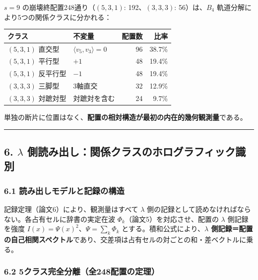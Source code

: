 \documentclass[
]{ltjsarticle}
\newcounter{none} %
\begin{document}
\(s=9\) の崩壊終配置248通り（\((5,3,1)\): 192、\((3,3,3)\):
56）は、\(B_4\) 軌道分解により5つの関係クラスに分かれる：

{\def\LTcaptype{none} %
\begin{longtable}[]{@{}llrr@{}}
\toprule\noalign{}
クラス & 不変量 & 配置数 & 比率 \\
\midrule\noalign{}
\endhead
\bottomrule\noalign{}
\endlastfoot
\((5,3,1)\) 直交型 & \(\langle v_5,v_3\rangle=0\) & 96 & 38.7\% \\
\((5,3,1)\) 平行型 & \(+1\) & 48 & 19.4\% \\
\((5,3,1)\) 反平行型 & \(-1\) & 48 & 19.4\% \\
\((3,3,3)\) 三脚型 & 3軸直交 & 32 & 12.9\% \\
\((3,3,3)\) 対蹠対型 & 対蹠対を含む & 24 & 9.7\% \\
\end{longtable}
}

単独の断片に位置はなく、\textbf{配置の相対構造が最初の内在的幾何観測量}である。

\begin{center}\rule{0.5\linewidth}{0.5pt}\end{center}

\subsection{\texorpdfstring{6. \(\lambda\)
側読み出し：関係クラスのホログラフィック識別}{6. \textbackslash lambda 側読み出し：関係クラスのホログラフィック識別}}\label{lambda-ux5074ux8aadux307fux51faux3057ux95a2ux4fc2ux30afux30e9ux30b9ux306eux30dbux30edux30b0ux30e9ux30d5ux30a3ux30c3ux30afux8b58ux5225}

\subsubsection{6.1
読み出しモデルと記録の構造}\label{ux8aadux307fux51faux3057ux30e2ux30c7ux30ebux3068ux8a18ux9332ux306eux69cbux9020}

記録定理（論文6）により、観測量はすべて \(\lambda\)
側の記録として読めなければならない。各占有セルに辞書の実定在波
\(\Phi_k\)（論文5）を対応させ、配置の \(\lambda\) 側記録を強度
\(I(x)=\Psi(x)^2\)、\(\Psi=\sum_{k}\Phi_k\)
とする。積和公式により、\textbf{\(\lambda\)
側記録＝配置の自己相関スペクトル}であり、交差項は占有セルの対ごとの和・差ベクトルに乗る。

\subsubsection{6.2
5クラス完全分離（全248配置の定理）}\label{ux30afux30e9ux30b9ux5b8cux5168ux5206ux96e2ux5168248ux914dux7f6eux306eux5b9aux7406}
\end{document}
